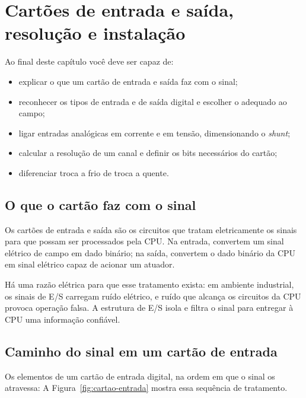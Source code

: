 \chapter{Cartões de entrada e saída, resolução e instalação}
\label{cap:es}

\begin{objetivos}
Ao final deste capítulo você deve ser capaz de:
\begin{itemize}
  \item explicar o que um cartão de entrada e saída faz com o sinal;
  \item reconhecer os tipos de entrada e de saída digital e escolher o adequado ao campo;
  \item ligar entradas analógicas em corrente e em tensão, dimensionando o \emph{shunt};
  \item calcular a resolução de um canal e definir os bits necessários do cartão;
  \item diferenciar troca a frio de troca a quente.
\end{itemize}
\end{objetivos}

\section{O que o cartão faz com o sinal}

Os cartões de entrada e saída são os circuitos que tratam eletricamente os sinais para que possam ser
processados pela CPU. Na entrada, convertem um sinal elétrico de campo em dado binário; na saída,
convertem o dado binário da CPU em sinal elétrico capaz de acionar um atuador.

Há uma razão elétrica para que esse tratamento exista: em ambiente industrial, os sinais de E/S
carregam ruído elétrico, e ruído que alcança os circuitos da CPU provoca operação falsa. A estrutura
de E/S isola e filtra o sinal para entregar à CPU uma informação confiável.


\section{Caminho do sinal em um cartão de entrada}

Os elementos de um cartão de entrada digital, na ordem em que o sinal os atravessa: A Figura~\ref{fig:cartao-entrada} mostra essa sequência de tratamento.

